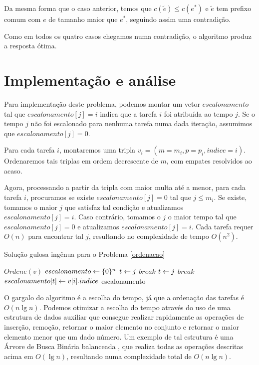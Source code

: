 Da mesma forma que o caso anterior, temos que $c(\widetilde{e}) \leq c(e^*)$ e $\widetilde{e}$ tem prefixo comum com $e$ de tamanho maior que $e^*$, seguindo assim uma contradição.

Como em todos os quatro casos chegamos numa contradição, o algoritmo produz a resposta ótima.

\section{Implementação e análise}

Para implementação deste problema, podemos montar um vetor $escalonamento$ tal que $escalonamento[j] = i$ indica que a tarefa $i$ foi atribuída ao tempo $j$. Se o tempo $j$ não foi escalonado para nenhuma tarefa numa dada iteração, assumimos que $escalonamento[j] = 0$.

Para cada tarefa $i$, montaremos uma tripla $v_i = (m = m_i, p = p_i, indice = i)$. Ordenaremos tais triplas em ordem decrescente de $m$, com empates resolvidos ao acaso. 

Agora, processando a partir da tripla com maior multa até a menor, para cada tarefa $i$, procuramos se existe $escalonamento[j] = 0$ tal que $j \leq m_i$. Se existe, tomamos o maior $j$ que satisfaz tal condição e atualizamos $escalonamento[j] = i$. Caso contrário, tomamos o $j$ o maior tempo tal que $escalonamento[j] = 0$ e atualizamos $escalonamento[j] = i$. Cada tarefa requer $O(n)$ para encontrar tal $j$, resultando no complexidade de tempo $O(n^2)$.

\begin{algorithm}[H]
\caption{Solução gulosa ingênua para o Problema \ref{ordenacao}}
\label{ordenacao:code_naive}
\begin{algorithmic}[1]
    \State $Ordene(v)$
    \State $escalonamento \leftarrow \{0\}^n$
                \State $t \leftarrow j$
                \State $break$
            \EndIf
        \EndFor
                \State $t \leftarrow j$
                \State $break$
            \EndIf
        \EndFor
        \State $escalonamento[t] \leftarrow v[i].indice$
    \EndFor
    \State \Return escalonamento
\EndFunction
\end{algorithmic}
\end{algorithm}

O gargalo do algoritmo é a escolha do tempo, já que a ordenação das tarefas é $O(n \lg n)$. Podemos otimizar a escolha do tempo através do uso de uma estrutura de dados auxiliar que consegue realizar rapidamente as operações de inserção, remoção, retornar o maior elemento no conjunto e retornar o maior elemento menor que um dado número. Um exemplo de tal estrutura é uma Árvore de Busca Binária balanceada \cite{mehta2004handbook}, que realiza todas as operações descritas acima em $O(\lg n)$, resultando numa complexidade total de $O(n \lg n)$.

